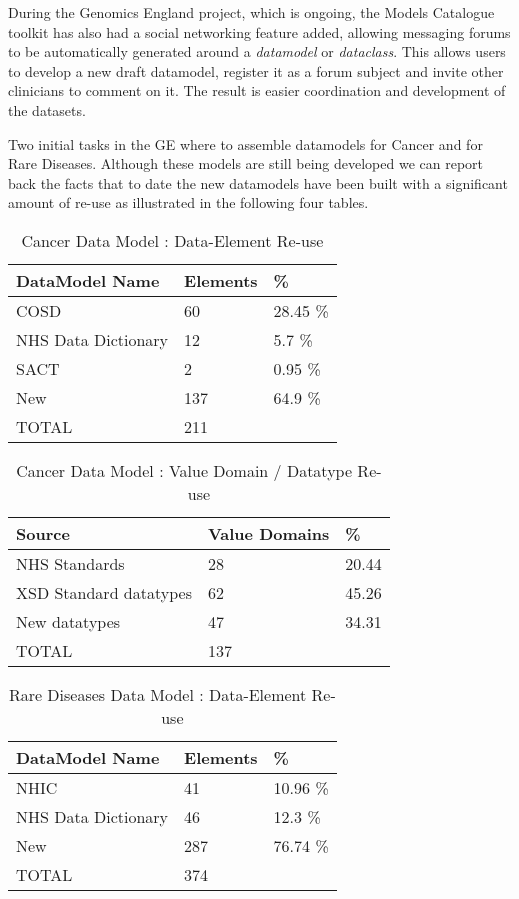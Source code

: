  



During the Genomics England project, which is ongoing, the Models Catalogue toolkit has also had a social networking feature added, allowing messaging forums to be automatically generated around a \emph{datamodel} or \emph{dataclass}. This allows users to develop a new draft datamodel, register it as a forum subject and invite other clinicians to comment on it. The result is easier coordination and development of the datasets. 

Two initial tasks in the GE where to assemble datamodels for Cancer and for Rare Diseases. Although these models are still being developed we can report back the facts that to date the new datamodels have been built with a significant amount of re-use as illustrated in the following four tables.

\begin{table}[h]
	\caption{Cancer Data Model : Data-Element Re-use}
	\begin{tabular}{ p{2.8cm} p{1.8cm}  p{1.8cm}   }  %
		\hline
		DataModel Name &  Elements & \%  \\ 
		\hline
		COSD & 60 & 28.45 \% \\
		NHS Data Dictionary & 12 & 5.7 \% \\
		SACT & 2 & 0.95 \% \\
		New & 137 & 64.9 \% \\
		\hline
		TOTAL & 211
	\end{tabular}
\end{table}

\begin{table}[h]
		\caption{Cancer Data Model : Value Domain / Datatype Re-use}
	\begin{tabular}{p{2.8cm} p{1.8cm}  p{1.8cm}     }  %
		\hline
		Source & Value Domains& \%  \\ 
		\hline
		NHS Standards & 28 & 20.44\\
		XSD Standard datatypes & 62 & 45.26 \\
		New datatypes & 47 & 34.31 \\
		\hline
		TOTAL & 137
	\end{tabular}
\end{table}

\begin{table}[h]
	\caption{Rare Diseases Data Model : Data-Element Re-use}
	\begin{tabular}{ p{2.8cm} p{1.8cm}  p{1.8cm}   }  %
		\hline
		DataModel Name &  Elements & \%  \\ 
		\hline
		NHIC & 41 & 10.96 \% \\
		NHS Data Dictionary & 46 & 12.3 \% \\
		New & 287 & 76.74 \% \\
		\hline
		TOTAL & 374
	\end{tabular}
\end{table}

